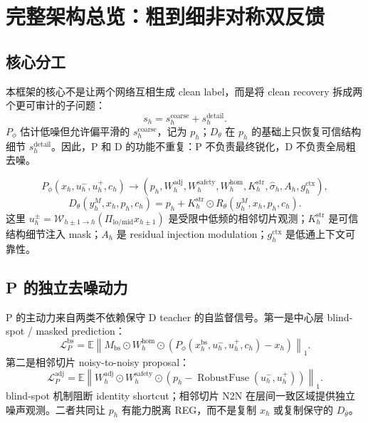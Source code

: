 \documentclass[11pt,a4paper,UTF8,fontset=fandol]{ctexart}
\theoremstyle{definition}
\DeclareMathOperator{\RobustFuse}{RobustFuse}
\begin{document}
\tableofcontents
\newpage




\section{完整架构总览：粗到细非对称双反馈}

\subsection{核心分工}

本框架的核心不是让两个网络互相生成 clean label，而是将 clean recovery 拆成两个更可审计的子问题：
\begin{equation}
 s_h=s_h^{\mathrm{coarse}}+s_h^{\mathrm{detail}}.
\end{equation}
$P_\phi$ 估计低噪但允许偏平滑的 $s_h^{\mathrm{coarse}}$，记为 $p_h$；$D_\theta$ 在 $p_h$ 的基础上只恢复可信结构细节 $s_h^{\mathrm{detail}}$。因此，P 和 D 的功能不重复：P 不负责最终锐化，D 不负责全局粗去噪。

\begin{equation}
 P_\phi(x_h,u_h^-,u_h^+,c_h)
\rightarrow (p_h,W_h^{\mathrm{adj}},W_h^{\mathrm{safety}},W_h^{\mathrm{hom}},K_h^{\mathrm{str}},\widehat\sigma_h,A_h,g_h^{\mathrm{ctx}}),
\end{equation}
\begin{equation}
 D_\theta(y_h^M,x_h,p_h,c_h)=p_h+K_h^{\mathrm{str}}\odot R_\theta(y_h^M,x_h,p_h,c_h).
\end{equation}
这里 $u_h^\pm=\mathcal W_{h\pm1\to h}(\Pi_{\mathrm{lo/mid}}x_{h\pm1})$ 是受限中低频的相邻切片观测；$K_h^{\mathrm{str}}$ 是可信结构细节注入 mask；$A_h$ 是 residual injection modulation；$g_h^{\mathrm{ctx}}$ 是低通上下文可靠性。

\subsection{P 的独立去噪动力}

P 的主动力来自两类不依赖保守 D teacher 的自监督信号。第一是中心层 blind-spot / masked prediction：
\begin{equation}
\mathcal L_P^{\mathrm{bs}}
=\mathbb E\left\|M_{\mathrm{bs}}\odot W_h^{\mathrm{hom}}\odot\left(P_\phi(x_h^{\mathrm{bs}},u_h^-,u_h^+,c_h)-x_h\right)\right\|_1.
\end{equation}
第二是相邻切片 noisy-to-noisy proposal：
\begin{equation}
\mathcal L_P^{\mathrm{adj}}
=\mathbb E\left\|W_h^{\mathrm{adj}}\odot W_h^{\mathrm{safety}}\odot\left(p_h-\RobustFuse(u_h^-,u_h^+)\right)\right\|_1.
\end{equation}
blind-spot 机制阻断 identity shortcut；相邻切片 N2N 在层间一致区域提供独立噪声观测。二者共同让 $p_h$ 有能力脱离 REG，而不是复制 $x_h$ 或复制保守的 $D_{\bar\theta}$。
\end{document}
